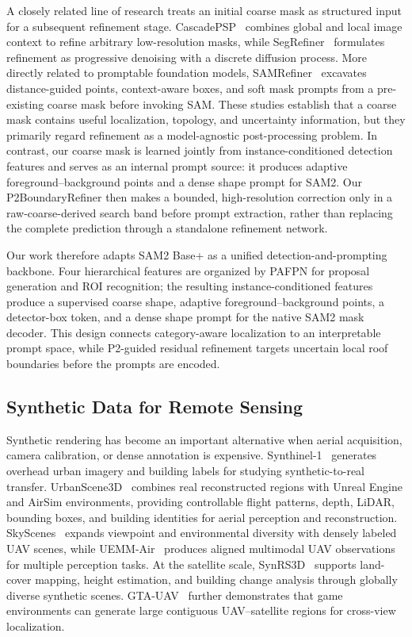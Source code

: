 \documentclass[letterpaper,journal]{IEEEtran}
\begin{document}
A closely related line of research treats an initial coarse mask as structured input for a subsequent refinement stage. CascadePSP~\cite{ref_cascadepsp} combines global and local image context to refine arbitrary low-resolution masks, while SegRefiner~\cite{ref_segrefiner} formulates refinement as progressive denoising with a discrete diffusion process. More directly related to promptable foundation models, SAMRefiner~\cite{ref_samrefiner} excavates distance-guided points, context-aware boxes, and soft mask prompts from a pre-existing coarse mask before invoking SAM. These studies establish that a coarse mask contains useful localization, topology, and uncertainty information, but they primarily regard refinement as a model-agnostic post-processing problem. In contrast, our coarse mask is learned jointly from instance-conditioned detection features and serves as an internal prompt source: it produces adaptive foreground--background points and a dense shape prompt for SAM2. Our P2BoundaryRefiner then makes a bounded, high-resolution correction only in a raw-coarse-derived search band before prompt extraction, rather than replacing the complete prediction through a standalone refinement network.

Our work therefore adapts SAM2 Base+ as a unified detection-and-prompting backbone. Four hierarchical features are organized by PAFPN for proposal generation and ROI recognition; the resulting instance-conditioned features produce a supervised coarse shape, adaptive foreground--background points, a detector-box token, and a dense shape prompt for the native SAM2 mask decoder. This design connects category-aware localization to an interpretable prompt space, while P2-guided residual refinement targets uncertain local roof boundaries before the prompts are encoded.

\subsection{Synthetic Data for Remote Sensing}
Synthetic rendering has become an important alternative when aerial acquisition, camera calibration, or dense annotation is expensive. Synthinel-1~\cite{ref_synthinel} generates overhead urban imagery and building labels for studying synthetic-to-real transfer. UrbanScene3D~\cite{ref_urbanscene3d} combines real reconstructed regions with Unreal Engine and AirSim environments, providing controllable flight patterns, depth, LiDAR, bounding boxes, and building identities for aerial perception and reconstruction. SkyScenes~\cite{ref_skyscenes} expands viewpoint and environmental diversity with densely labeled UAV scenes, while UEMM-Air~\cite{ref_uemmair} produces aligned multimodal UAV observations for multiple perception tasks. At the satellite scale, SynRS3D~\cite{ref_synrs3d} supports land-cover mapping, height estimation, and building change analysis through globally diverse synthetic scenes. GTA-UAV~\cite{ref_gtauav} further demonstrates that game environments can generate large contiguous UAV--satellite regions for cross-view localization.
\end{document}
